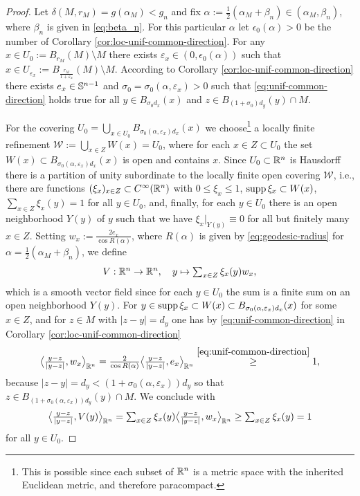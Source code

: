  \begin{proof}
Let $\delta(M,r_M)=g(\alpha_M)<g_n$ and fix 
$\alpha:=\frac12(\alpha_M+\beta_n)\in (\alpha_M,\beta_n)$, where
$\beta_n$ is given in \eqref{eq:beta_n}. For this particular  $\alpha$ let
$\epsilon_0(\alpha)>0$ 
be the number of Corollary \ref{cor:loc-unif-common-direction}. For any $x\in U_0:=
B_{r_M}(M)\setminus M$ there exists $\varepsilon_x\in (0,\epsilon_0(\alpha))$ such
that $x\in U_{\varepsilon_x}:=B_{\frac{r_M}{1+\varepsilon_x}}(M)\setminus M$.
According to Corollary \ref{cor:loc-unif-common-direction} there exists $e_x\in\S^{n-1}$
and $\sigma_0=\sigma_0(\alpha,\varepsilon_x)>0$ such that \eqref{eq:unif-common-direction}
holds true for all $y\in B_{\sigma_0 d_x}(x)$ and $z\in B_{(1+\sigma_0)d_y}(y)\cap M$.

 For the covering $U_0=\bigcup_{x\in U_0}B_{\sigma_0(\alpha,\varepsilon_x)d_x}(x)$
 we choose\footnote{This is possible since each subset of $\R^n$ is a metric space
 with the inherited Euclidean metric, and therefore paracompact.}
 a locally finite refinement $\mathcal{W}:=\bigcup_{x\in Z}W(x)=U_0$,
 where for each $x\in Z\subset U_0$ the set 
 $W(x)\subset B_{\sigma_0(\alpha,\varepsilon_x)d_x}(x)$ is open and contains
 $x.$ Since $U_0\subset\R^n$ is Hausdorff there is a partition
 of unity subordinate to the locally finite open covering $\mathcal{W}$, i.e.,
 there are functions $(\xi_x)_{x\in Z}\subset C^\infty(\R^n)$ with $0\le\xi_x\le 1$,
 $\supp\xi_x\subset W(x)$, $\sum_{x\in Z}\xi_x(y)=1$ for all $y\in U_0$,
 and, finally, for each $y\in U_0$ there is an open neighborhood $Y(y)$
 of $y$ such
 that we have $\xi_x|_{Y(y)}\equiv 0$ for all but finitely many $x\in Z$. Setting
 $w_x:=\frac{2e_x}{\cos R(\alpha)}$, where $R(\alpha)$ is given by 
 \eqref{eq:geodesic-radius} for $\alpha=\frac12 (\alpha_M+\beta_n)$,
 we define 
 \begin{equation}\label{eq:def-vf}
\textstyle
V:\R^n\to\R^n,\quad y\mapsto \sum_{x\in Z}\xi_x(y)w_x,
 \end{equation}
 which is a smooth vector field since for each $y\in U_0$ the sum is a finite sum on 
 an open neighborhood $Y(y)$. 
 For $y\in\supp\xi_x\subset W(x)\subset
 B_{\sigma_0(\alpha,\varepsilon_x)d_x}(x)$ for some $x\in Z$, and for $z\in M$ with 
 $|z-y|=d_y$ one has by \eqref{eq:unif-common-direction} in Corollary 
 \ref{cor:loc-unif-common-direction}
 $$
 \textstyle
 \big\langle\frac{y-z}{|y-z|},w_x\big\rangle_{\R^n}=\frac2{\cos R(\alpha)}
 \big\langle\frac{y-z}{|y-z|},e_x\big\rangle_{\R^n}
 \overset{\eqref{eq:unif-common-direction}}{\ge}
1,
$$
because $|z-y|=d_y<(1+\sigma_0(\alpha,\varepsilon_x))d_y$ so that
$z\in B_{(1+\sigma_0(\alpha,\varepsilon_x))d_y}(y)\cap M$. We conclude with
$$
\textstyle
\big\langle\frac{y-z}{|y-z|},V(y)\big\rangle_{\R^n}=\sum_{x\in Z}\xi_x(y)
 \big\langle\frac{y-z}{|y-z|},w_x\big\rangle_{\R^n}\ge\sum_{x\in Z}\xi_x(y)=1
 $$
  for all $y\in U_0$.
 \end{proof}
